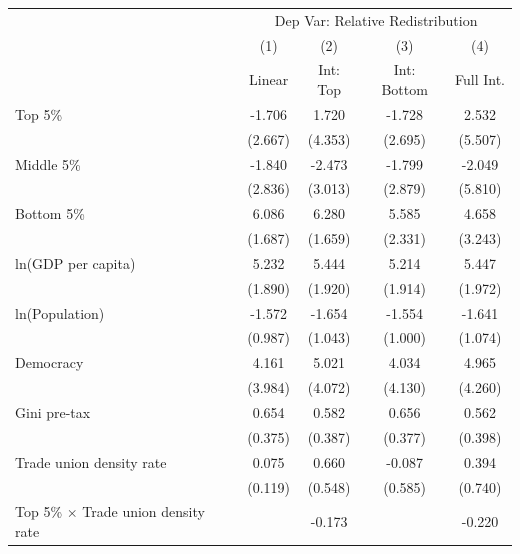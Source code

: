 \begin{tabular}{l*{4}{c}}
\toprule
                    &\multicolumn{4}{c}{Dep Var: Relative Redistribution}\\
                    &\multicolumn{1}{c}{(1)}&\multicolumn{1}{c}{(2)}&\multicolumn{1}{c}{(3)}&\multicolumn{1}{c}{(4)}\\
                    &\multicolumn{1}{c}{Linear}&\multicolumn{1}{c}{Int: Top}&\multicolumn{1}{c}{Int: Bottom}&\multicolumn{1}{c}{Full Int.}\\
\midrule
Top 5\%             &      -1.706&       1.720&      -1.728&       2.532\\
                    &     (2.667)&     (4.353)&     (2.695)&     (5.507)\\
\addlinespace
Middle 5\%          &      -1.840&      -2.473&      -1.799&      -2.049\\
                    &     (2.836)&     (3.013)&     (2.879)&     (5.810)\\
\addlinespace
Bottom 5\%          &       6.086&       6.280&       5.585&       4.658\\
                    &     (1.687)&     (1.659)&     (2.331)&     (3.243)\\
\addlinespace
ln(GDP per capita)  &       5.232&       5.444&       5.214&       5.447\\
                    &     (1.890)&     (1.920)&     (1.914)&     (1.972)\\
\addlinespace
ln(Population)      &      -1.572&      -1.654&      -1.554&      -1.641\\
                    &     (0.987)&     (1.043)&     (1.000)&     (1.074)\\
\addlinespace
Democracy           &       4.161&       5.021&       4.034&       4.965\\
                    &     (3.984)&     (4.072)&     (4.130)&     (4.260)\\
\addlinespace
Gini pre-tax        &       0.654&       0.582&       0.656&       0.562\\
                    &     (0.375)&     (0.387)&     (0.377)&     (0.398)\\
\addlinespace
Trade union density rate&       0.075&       0.660&      -0.087&       0.394\\
                    &     (0.119)&     (0.548)&     (0.585)&     (0.740)\\
\addlinespace
Top 5\% $\times$ Trade union density rate&            &      -0.173&            &      -0.220\\

\end{tabular}

